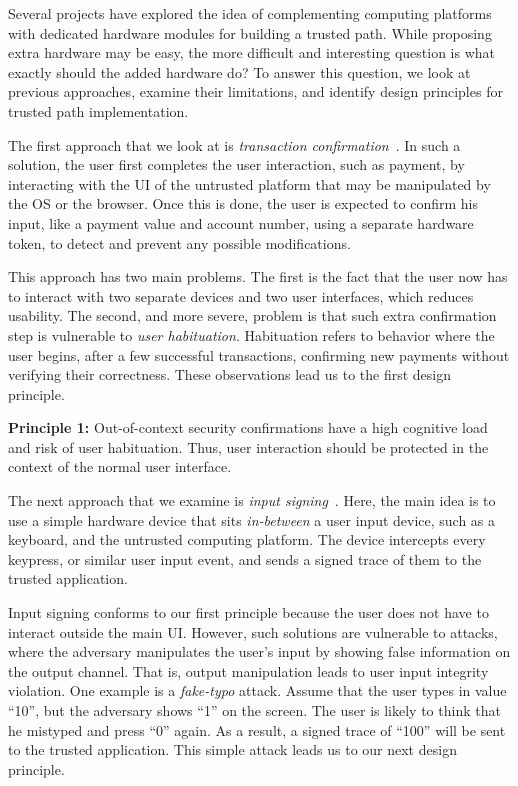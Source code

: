 \documentclass[letterpaper,twocolumn,10pt]{article}
\begin{document}
Several projects have explored the idea of complementing computing platforms with dedicated hardware modules for building a trusted path. While proposing extra hardware may be easy, the more difficult and interesting question is what exactly should the added hardware do? To answer this question, we look at previous approaches, examine their limitations, and identify design principles for trusted path implementation.
    
The first approach that we look at is \emph{transaction confirmation}~\cite{filyanov2011uni}. In such a solution, the user first completes the user interaction, such as payment, by interacting with the UI of the untrusted platform that may be manipulated by the OS or the browser. Once this is done, the user is expected to confirm his input, like a payment value and account number, using a separate hardware token, to detect and prevent any possible modifications.

This approach has two main problems. The first is the fact that the user now has to interact with two separate devices and two user interfaces, which reduces usability. The second, and more severe, problem is that such extra confirmation step is vulnerable to \emph{user habituation}. Habituation refers to behavior where the user begins, after a few successful transactions, confirming new payments without verifying their correctness. These observations lead us to the first design principle.  

\begin{tcolorbox}
\textbf{Principle 1:} Out-of-context security confirmations have a high cognitive load and risk of user habituation. Thus, user interaction should be protected in the context of the normal user interface.
\end{tcolorbox}

The next approach that we examine is \emph{input signing}~\cite{IntegriKey}. Here, the main idea is to use a simple hardware device that sits \emph{in-between} a user input device, such as a keyboard, and the untrusted computing platform. The device intercepts every keypress, or similar user input event, and sends a signed trace of them to the trusted application. 

Input signing conforms to our first principle because the user does not have to interact outside the main UI. However, such solutions are vulnerable to attacks, where the adversary manipulates the user's input by showing false information on the output channel. That is, output manipulation leads to user input integrity violation. One example is a \emph{fake-typo} attack. Assume that the user types in value ``10'', but the adversary shows ``1'' on the screen. The user is likely to think that he mistyped and press ``0'' again. As a result, a signed trace of ``100'' will be sent to the trusted application. This simple attack leads us to our next design principle.
\end{document}
